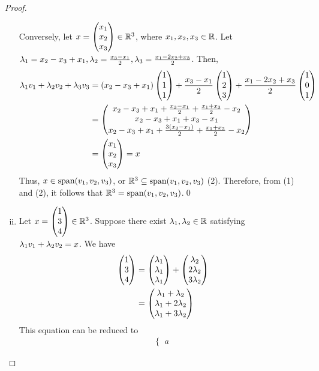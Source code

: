 \begin{proof}
\begin{enumerate}[(i)]
        Conversely, let $x=\begin{pmatrix} x_1\\ x_2\\ x_3\end{pmatrix}\in\mathbb R^3$, where $x_1,x_2,x_3\in\mathbb R$. Let $\lambda_1=x_2-x_3+x_1,\lambda_2=\frac{x_3-x_1}{2},\lambda_3=\frac{x_1-2x_2+x_3}{2}$. Then,
        \[
            \begin{aligned}
                \lambda_1v_1+\lambda_2v_2+\lambda_3v_3 &= (x_2-x_3+x_1)\begin{pmatrix} 1\\ 1\\ 1\end{pmatrix}+\frac{x_3-x_1}{2}\begin{pmatrix} 1\\ 2\\ 3\end{pmatrix}+\frac{x_1-2x_2+x_3}{2}\begin{pmatrix} 1\\ 0\\ 1\end{pmatrix}\\
                                              &= \begin{pmatrix} x_2-x_3+x_1+\frac{x_3-x_1}{2}+\frac{x_1+x_3}{2}-x_2\\ x_2-x_3+x_1+x_3-x_1\\ x_2-x_3+x_1+\frac{3(x_3-x_1)}{2}+\frac{x_1+x_3}{2}-x_2\end{pmatrix}\\
                                              &= \begin{pmatrix} x_1\\ x_2\\ x_3\end{pmatrix}=x
            \end{aligned}  
        \]
        Thus, $x\in\textnormal{span}(v_1,v_2,v_3)$, or $\mathbb R^3\subseteq\textnormal{span}(v_1,v_2,v_3)$ (2). Therefore, from (1) and (2), it follows that $\mathbb R^3=\textnormal{span}(v_1,v_2,v_3)$.\qed
        \item Let $x=\begin{pmatrix} 1\\ 3\\ 4\end{pmatrix}\in\mathbb R^3$. Suppose there exist $\lambda_1,\lambda_2\in\mathbb R$ satisfying $\lambda_1v_1+\lambda_2v_2=x$. We have
        \[
            \begin{aligned}
                \begin{pmatrix} 1\\ 3\\ 4\end{pmatrix} &= \begin{pmatrix} \lambda_1\\ \lambda_1\\ \lambda_1\end{pmatrix}+\begin{pmatrix} \lambda_2\\ 2\lambda_2\\ 3\lambda_2\end{pmatrix}\\
                                      &= \begin{pmatrix} \lambda_1+\lambda_2\\ \lambda_1+2\lambda_2\\ \lambda_1+3\lambda_2\end{pmatrix}
            \end{aligned}  
        \]
        This equation can be reduced to
        \begin{align*}
            \begin{cases}
                a
            \end{cases}
        \end{align*}
    \end{enumerate}
\end{proof}